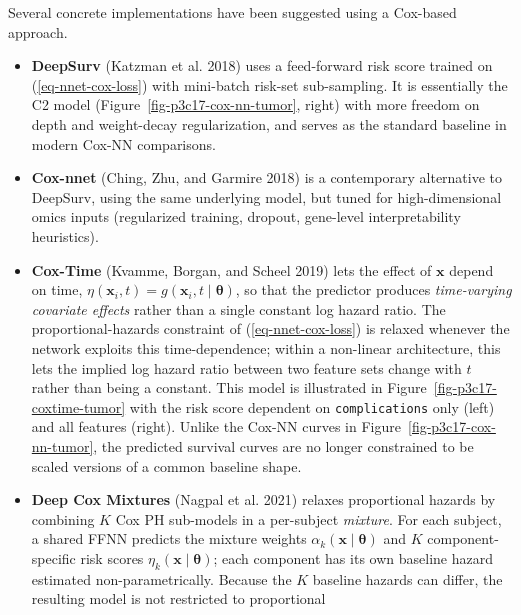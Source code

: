 \documentclass[
  letterpaper,
  krantz2]{style/krantz}
\providecommand{\tightlist}{%
  \setlength{\itemsep}{0pt}\setlength{\parskip}{0pt}}
\begin{document}
Several concrete implementations have been suggested using a Cox-based
approach.

\begin{itemize}
\tightlist
\item
  \textbf{DeepSurv} (Katzman et al. 2018) uses a feed-forward risk score
  trained on (\ref{eq-nnet-cox-loss}) with mini-batch risk-set
  sub-sampling. It is essentially the C2 model
  (Figure~\ref{fig-p3c17-cox-nn-tumor}, right) with more freedom on
  depth and weight-decay regularization, and serves as the standard
  baseline in modern Cox-NN
  comparisons.
\item
  \textbf{Cox-nnet} (Ching, Zhu, and Garmire 2018) is a contemporary
  alternative to DeepSurv, using the same underlying model, but tuned
  for high-dimensional omics inputs (regularized training, dropout,
  gene-level interpretability
  heuristics).
\item
  \textbf{Cox-Time} (Kvamme, Borgan, and Scheel 2019) lets the effect of
  \(\mathbf{x}\) depend on time,
  \(\eta(\mathbf{x}_i, t) = g(\mathbf{x}_i, t \mid \boldsymbol{\theta})\),
  so that the predictor produces \emph{time-varying covariate effects}
  rather than a single constant log hazard ratio. The
  proportional-hazards constraint of (\ref{eq-nnet-cox-loss}) is relaxed
  whenever the network exploits this time-dependence; within a
  non-linear architecture, this lets the implied log hazard ratio
  between two feature sets change with \(t\) rather than being a
  constant. This model is illustrated in
  Figure~\ref{fig-p3c17-coxtime-tumor} with the risk score dependent on
  \texttt{complications} only (left) and all features (right). Unlike
  the Cox-NN curves in Figure~\ref{fig-p3c17-cox-nn-tumor}, the
  predicted survival curves are no longer constrained to be scaled
  versions of a common baseline
  shape.
\item
  \textbf{Deep Cox Mixtures} (Nagpal et al. 2021) relaxes proportional
  hazards by combining \(K\) Cox PH sub-models in a per-subject
  \emph{mixture}. For each subject, a shared FFNN predicts the mixture
  weights \(\alpha_k(\mathbf{x}\mid \boldsymbol{\theta})\) and \(K\)
  component-specific risk scores
  \(\eta_k(\mathbf{x}\mid \boldsymbol{\theta})\); each component has its
  own baseline hazard estimated non-parametrically. Because the \(K\)
  baseline hazards can differ, the resulting model is not restricted to
  proportional

\end{itemize}
\end{document}
